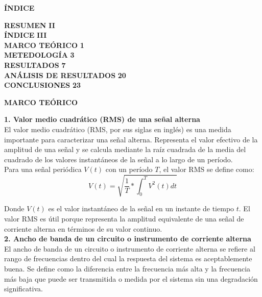 \documentclass[12pt]{article}
\begin{document}
	\newpage
	
	\begin{center}
		\textbf{\large ÍNDICE}\\
	\end{center}
	
	\noindent \textbf{RESUMEN} \hfill \textbf{II}\\
	\noindent \textbf{ÍNDICE} \hfill \textbf{III}\\
	\noindent \textbf{MARCO TEÓRICO} \hfill \textbf{1}\\
	\noindent \textbf{METEDOLOGÍA} \hfill \textbf{3}\\
	\noindent \textbf{RESULTADOS} \hfill \textbf{7}\\
	\noindent \textbf{ANÁLISIS DE RESULTADOS} \hfill \textbf{20}\\
	\noindent \textbf{CONCLUSIONES} \hfill \textbf{23}\\
	
	\newpage
	
	
	\begin{center}
		\textbf{\large MARCO TEÓRICO}\\
	\end{center}
	
	\textbf{1. Valor medio cuadrático (RMS) de una señal alterna}\\
	
	El valor medio cuadrático (RMS, por sus siglas en inglés) es una medida importante para caracterizar una señal alterna. Representa el valor efectivo de la amplitud de una señal y se calcula mediante la raíz cuadrada de la media del cuadrado de los valores instantáneos de la señal a lo largo de un período.\\
	
	Para una señal periódica $V(t)$ con un período $T$, el valor RMS se define como: $$V(t) = \sqrt{\frac{1}{T}*\int_{0}^{T}V^2(t)dt}$$	
	
	Donde $V(t)$ es el valor instantáneo de la señal en un instante de tiempo $t$. El valor RMS es útil porque representa la amplitud equivalente de una señal de corriente alterna en términos de su valor continuo.\\
	
	\textbf{2. Ancho de banda de un circuito o instrumento de corriente alterna}\\
	
	El ancho de banda de un circuito o instrumento de corriente alterna se refiere al rango de frecuencias dentro del cual la respuesta del sistema es aceptablemente buena. Se define como la diferencia entre la frecuencia más alta y la frecuencia más baja que puede ser transmitida o medida por el sistema sin una degradación significativa.\\
	
\end{document}
